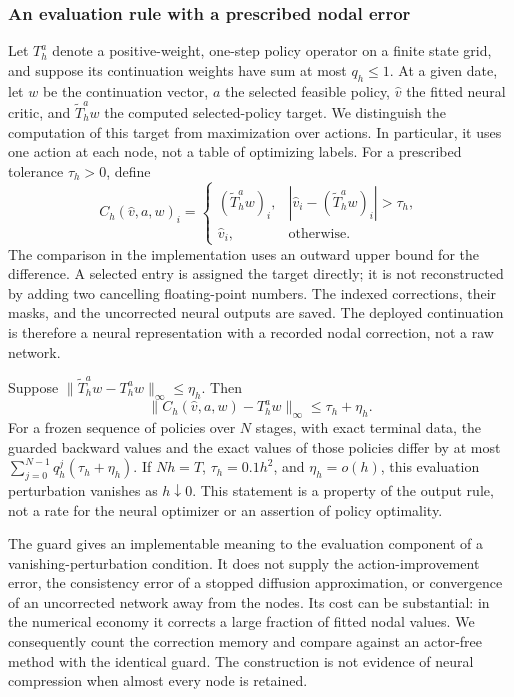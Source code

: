 \subsubsection{An evaluation rule with a prescribed nodal error}
Let $T_h^a$ denote a positive-weight, one-step policy operator on a finite state grid, and suppose its continuation weights have sum at most $q_h\leq1$. At a given date, let $w$ be the continuation vector, $a$ the selected feasible policy, $\widehat v$ the fitted neural critic, and $\widetilde T_h^a w$ the computed selected-policy target. We distinguish the computation of this target from maximization over actions. In particular, it uses one action at each node, not a table of optimizing labels. For a prescribed tolerance $\tau_h>0$, define
\begin{equation}\label{eq:r9guard}
 C_h(\widehat v,a,w)_i=
 \begin{cases}
  (\widetilde T_h^a w)_i,& |\widehat v_i-(\widetilde T_h^a w)_i|>\tau_h,\\
  \widehat v_i,&\text{otherwise}.
 \end{cases}
\end{equation}
The comparison in the implementation uses an outward upper bound for the difference. A selected entry is assigned the target directly; it is not reconstructed by adding two cancelling floating-point numbers. The indexed corrections, their masks, and the uncorrected neural outputs are saved. The deployed continuation is therefore a neural representation with a recorded nodal correction, not a raw network.

\begin{proposition}\label{prop:r9guard}
Suppose $\|\widetilde T_h^a w-T_h^a w\|_\infty\leq\eta_h$. Then
\[
 \|C_h(\widehat v,a,w)-T_h^a w\|_\infty\leq\tau_h+\eta_h.
\]
For a frozen sequence of policies over $N$ stages, with exact terminal data, the guarded backward values and the exact values of those policies differ by at most $\sum_{j=0}^{N-1}q_h^j(\tau_h+\eta_h)$.
If $N h=T$, $\tau_h=0.1h^2$, and $\eta_h=o(h)$, this evaluation perturbation vanishes as $h\downarrow0$. This statement is a property of the output rule, not a rate for the neural optimizer or an assertion of policy optimality.
\end{proposition}

The guard gives an implementable meaning to the evaluation component of a vanishing-perturbation condition. It does not supply the action-improvement error, the consistency error of a stopped diffusion approximation, or convergence of an uncorrected network away from the nodes. Its cost can be substantial: in the numerical economy it corrects a large fraction of fitted nodal values. We consequently count the correction memory and compare against an actor-free method with the identical guard. The construction is not evidence of neural compression when almost every node is retained.

